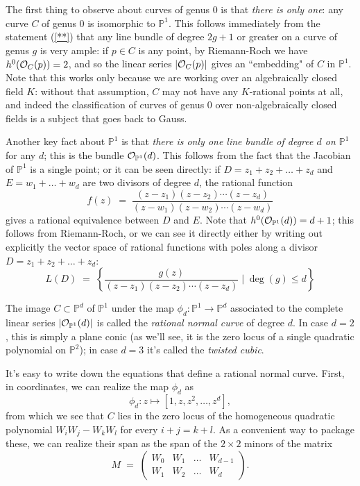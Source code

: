 \documentclass[12pt, leqno]{article}
\def\PP{{\mathbb P}}
\def\cO{{\cal O}}
\begin{document}
The first thing to observe about curves of genus 0 is that \emph{there is only one}: any curve $C$ of genus 0 is isomorphic to $\PP^1$. This follows immediately from the statement (\ref{**}) that any line bundle of degree $2g+1$ or greater on a curve of genus $g$ is very ample: if $p \in C$ is any point, by Riemann-Roch we have $h^0(\cO_C(p)) = 2$, and so the linear series $|\cO_C(p)|$ gives an ``embedding" of $C$ in $\PP^1$. Note that this works only because we are working over an algebraically closed field $K$: without that assumption, $C$ may not have any $K$-rational points at all, and indeed the classification of curves of genus 0 over non-algebraically closed fields is a subject that goes back to Gauss.

Another key fact about $\PP^1$ is that \emph{there is only one line bundle of degree $d$ on $\PP^1$} for any $d$; this is the bundle $\cO_{\PP^1}(d)$. This follows from the fact that the Jacobian of $\PP^1$ is a single point; or it can be seen directly: if $D = z_1+z_2+\dots+z_d$ and $E = w_1+\dots+w_d$ are two divisors of degree $d$, the rational function
$$
f(z) \; = \; \frac{(z-z_1)(z-z_2)\cdots(z-z_d)}{(z-w_1)(z-w_2)\cdots(z-w_d)}
$$
gives a rational equivalence between $D$ and $E$. Note that $h^0(\cO_{\PP^1}(d)) = d+1$; this follows from Riemann-Roch, or we can see it directly either by writing out explicitly the vector space of rational functions with poles along a divisor $D = z_1+z_2+\dots+z_d$:
$$
L(D) \; = \; \left\{ \frac{g(z)}{(z-z_1)(z-z_2)\cdots(z-z_d)} \mid \deg(g) \leq d \right\}
$$

The image $C \subset \PP^d$ of $\PP^1$ under the map $\phi_d : \PP^1 \to \PP^d$ associated to the complete linear series $|\cO_{\PP^1}(d)|$ is called the \emph{rational normal curve} of degree $d$. In case $d=2$, this is simply a plane conic (as we'll see, it is the zero locus of a single quadratic polynomial on $\PP^2$); in case $d=3$ it's called the \emph{twisted cubic}.

It's easy to write down the equations that define a rational normal curve. First, in coordinates, we can realize the map $\phi_d$ as
$$
\phi_d : z \mapsto [1, z, z^2,\dots,z^d],
$$
from which we see that $C$ lies in the zero locus of the homogeneous quadratic polynomial $W_iW_j - W_kW_l$ for every $i+j=k+l$. As a convenient way to package these, we can realize their span as the span of the $2\times 2$ minors of the matrix
$$
M \; = \; \begin{pmatrix}
W_0 & W_1 & \dots & W_{d-1} \\
W_1 & W_2 & \dots & W_d
\end{pmatrix}.
$$
\end{document}
